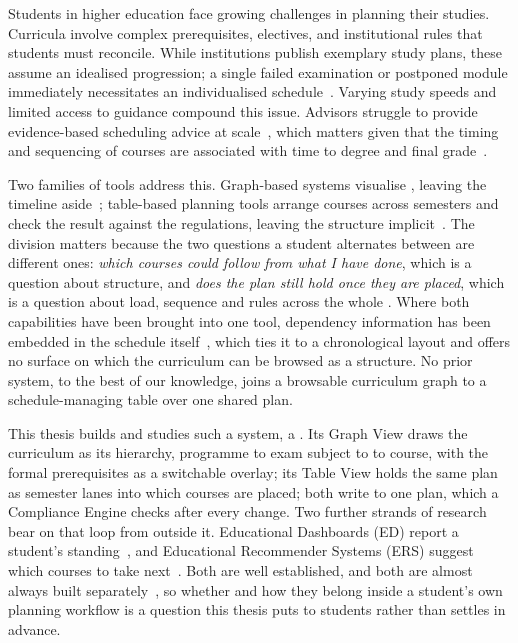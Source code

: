 \label{chap:introduction}
Students in higher education face growing challenges in planning their studies. Curricula involve complex prerequisites, electives, and institutional rules that students must reconcile. While institutions publish exemplary study plans, these assume an idealised progression; a single failed examination or postponed module immediately necessitates an individualised schedule~\cite{judel_supporting_2023}. Varying study speeds and limited access to guidance compound this issue. Advisors struggle to provide evidence-based scheduling advice at scale~\cite{schulte_large_2017}, which matters given that the timing and sequencing of courses are associated with time to degree and final grade~\cite{morsy_study_2019}.

Two families of tools address this. Graph-based systems visualise , leaving the timeline aside~\cite{auvinen_stops_2014, rollande_graph_2013, trippel_developing_2025}; table-based planning tools arrange courses across semesters and check the result against the regulations, leaving the structure implicit~\cite{hirmer_requirements_2022, judel_supporting_2023}. The division matters because the two questions a student alternates between are different ones: \emph{which courses could follow from what I have done}, which is a question about structure, and \emph{does the plan still hold once they are placed}, which is a question about load, sequence and rules across the whole . Where both capabilities have been brought into one tool, dependency information has been embedded in the schedule itself~\cite{roepke_study_2024, judel_supporting_2023}, which ties it to a chronological layout and offers no surface on which the curriculum can be browsed as a structure. No prior system, to the best of our knowledge, joins a browsable curriculum graph to a schedule-managing table over one shared plan.

This thesis builds and studies such a system, a . Its Graph View draws the curriculum as its  hierarchy, programme to exam subject to  to course, with the formal prerequisites as a switchable overlay; its Table View holds the same plan as semester lanes into which courses are placed; both write to one plan, which a Compliance Engine checks after every change. Two further strands of research bear on that loop from outside it. Educational Dashboards (ED) report a student's standing~\cite{schwendimann2017, verbert_learning_2020, loboda_mastery_2014}, and Educational Recommender Systems (ERS) suggest which courses to take next~\cite{bhumichitr_recommender_2017, esteban_helping_2020, al-badarenah_automated_2016}. Both are well established, and both are almost always built separately~\cite{bodily_review_2017}, so whether and how they belong inside a student's own planning workflow is a question this thesis puts to students rather than settles in advance.

